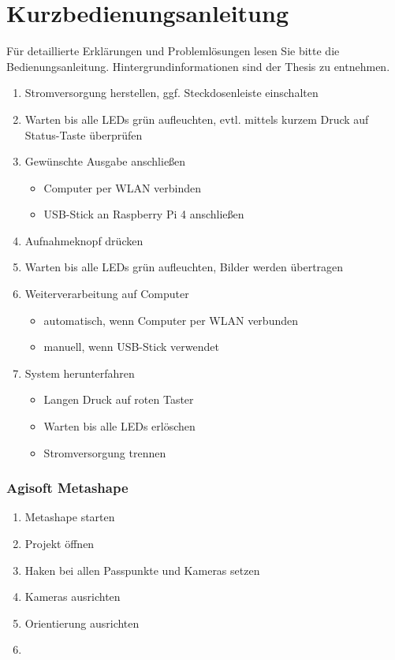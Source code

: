 \documentclass[./00PhotoBox.tex]{subfiles}
\begin{document}
\chapter{Kurzbedienungsanleitung}

Für detaillierte Erklärungen und Problemlösungen lesen Sie bitte die Bedienungsanleitung. Hintergrundinformationen sind der Thesis zu entnehmen.


\begin{enumerate}
    \item Stromversorgung herstellen, ggf. Steckdosenleiste einschalten
    \item Warten bis alle LEDs grün aufleuchten, evtl. mittels kurzem Druck auf Status-Taste überprüfen
    \item Gewünschte Ausgabe anschließen
          \begin{itemize}
              \item Computer per WLAN verbinden
              \item USB-Stick an Raspberry Pi 4 anschließen
          \end{itemize}
    \item Aufnahmeknopf drücken
    \item Warten bis alle LEDs grün aufleuchten, Bilder werden übertragen
    \item Weiterverarbeitung auf Computer
          \begin{itemize}
              \item automatisch, wenn Computer per WLAN verbunden
              \item manuell, wenn USB-Stick verwendet
          \end{itemize}
    \item System herunterfahren
          \begin{itemize}
              \item Langen Druck auf roten Taster
              \item Warten bis alle LEDs erlöschen
              \item Stromversorgung trennen
          \end{itemize}
\end{enumerate}

\subsection{Agisoft Metashape}
\begin{enumerate}
    \item Metashape starten
    \item Projekt öffnen
    \item Haken bei allen Passpunkte und Kameras setzen
    \item Kameras ausrichten
    \item Orientierung ausrichten
    \item {}
\end{enumerate}

\biblio
\end{document}
